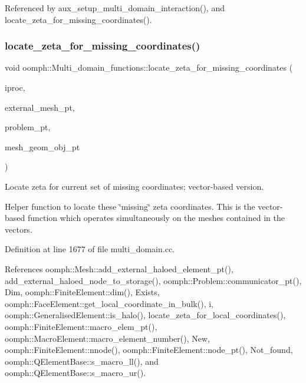 Referenced by aux\+\_\+setup\+\_\+multi\+\_\+domain\+\_\+interaction(), and locate\+\_\+zeta\+\_\+for\+\_\+missing\+\_\+coordinates().

\mbox{\label{namespaceoomph_1_1Multi__domain__functions_a2fee5918eeeaf87be5e996abb26c2dc1}} 
\subsubsection{\texorpdfstring{locate\+\_\+zeta\+\_\+for\+\_\+missing\+\_\+coordinates()}{locate\_zeta\_for\_missing\_coordinates()}}
{\footnotesize\ttfamily void oomph\+::\+Multi\+\_\+domain\+\_\+functions\+::locate\+\_\+zeta\+\_\+for\+\_\+missing\+\_\+coordinates (\begin{DoxyParamCaption}\item[{int \&}]{iproc,  }\item[{\hyperlink{classoomph_1_1Mesh}{Mesh} $\ast$const \&}]{external\+\_\+mesh\+\_\+pt,  }\item[{\hyperlink{classoomph_1_1Problem}{Problem} $\ast$}]{problem\+\_\+pt,  }\item[{\hyperlink{classoomph_1_1Vector}{Vector}$<$ \hyperlink{classoomph_1_1MeshAsGeomObject}{Mesh\+As\+Geom\+Object} $\ast$$>$ \&}]{mesh\+\_\+geom\+\_\+obj\+\_\+pt }\end{DoxyParamCaption})}



Locate zeta for current set of missing coordinates; vector-\/based version. 

Helper function to locate these \char`\"{}missing\char`\"{} zeta coordinates. This is the vector-\/based function which operates simultaneously on the meshes contained in the vectors. 

Definition at line 1677 of file multi\+\_\+domain.\+cc.



References oomph\+::\+Mesh\+::add\+\_\+external\+\_\+haloed\+\_\+element\+\_\+pt(), add\+\_\+external\+\_\+haloed\+\_\+node\+\_\+to\+\_\+storage(), oomph\+::\+Problem\+::communicator\+\_\+pt(), Dim, oomph\+::\+Finite\+Element\+::dim(), Exists, oomph\+::\+Face\+Element\+::get\+\_\+local\+\_\+coordinate\+\_\+in\+\_\+bulk(), i, oomph\+::\+Generalised\+Element\+::is\+\_\+halo(), locate\+\_\+zeta\+\_\+for\+\_\+local\+\_\+coordinates(), oomph\+::\+Finite\+Element\+::macro\+\_\+elem\+\_\+pt(), oomph\+::\+Macro\+Element\+::macro\+\_\+element\+\_\+number(), New, oomph\+::\+Finite\+Element\+::nnode(), oomph\+::\+Finite\+Element\+::node\+\_\+pt(), Not\+\_\+found, oomph\+::\+Q\+Element\+Base\+::s\+\_\+macro\+\_\+ll(), and oomph\+::\+Q\+Element\+Base\+::s\+\_\+macro\+\_\+ur().



